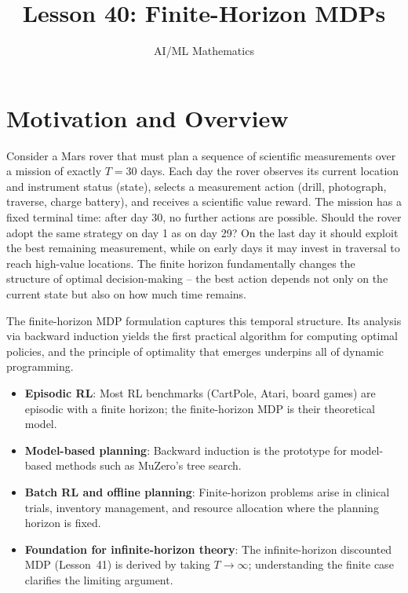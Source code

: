 \documentclass[11pt,a4paper]{article}
\title{Lesson 40: Finite-Horizon MDPs}
\author{AI/ML Mathematics}
\date{}
\begin{document}
\maketitle
\tableofcontents
\newpage


\section{Motivation and Overview}
\label{sec:motivation}

Consider a Mars rover that must plan a sequence of scientific
measurements over a mission of exactly $T = 30$ days. Each day the
rover observes its current location and instrument status (state),
selects a measurement action (drill, photograph, traverse, charge
battery), and receives a scientific value reward. The mission has a
fixed terminal time: after day 30, no further actions are possible.
Should the rover adopt the same strategy on day 1 as on day 29? On
the last day it should exploit the best remaining measurement, while
on early days it may invest in traversal to reach high-value
locations. The finite horizon fundamentally changes the structure of
optimal decision-making -- the best action depends not only on the
current state but also on how much time remains.

The finite-horizon MDP formulation captures this temporal structure.
Its analysis via backward induction yields the first practical
algorithm for computing optimal policies, and the principle of
optimality that emerges underpins all of dynamic programming.

\begin{rlconnection}[title={Why Finite-Horizon MDPs Matter for RL/ML}]
\begin{itemize}[nosep]
    \item \textbf{Episodic RL}: Most RL benchmarks (CartPole,
    Atari, board games) are episodic with a finite horizon; the
    finite-horizon MDP is their theoretical model.
    \item \textbf{Model-based planning}: Backward induction is the
    prototype for model-based methods such as MuZero's tree search.
    \item \textbf{Batch RL and offline planning}: Finite-horizon
    problems arise in clinical trials, inventory management, and
    resource allocation where the planning horizon is fixed.
    \item \textbf{Foundation for infinite-horizon theory}: The
    infinite-horizon discounted MDP (Lesson~41) is derived by taking
    $T \to \infty$; understanding the finite case clarifies the
    limiting argument.
\end{itemize}
\end{rlconnection}
\end{document}
